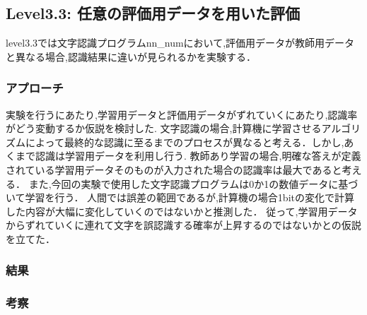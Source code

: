 \subsection{Level3.3: 任意の評価用データを用いた評価}

level3.3では文字認識プログラムnn\_numにおいて,評価用データが教師用データと異なる場合,認識結果に違いが見られるかを実験する．

\subsubsection{アプローチ}
実験を行うにあたり,学習用データと評価用データがずれていくにあたり,認識率がどう変動するか仮説を検討した.
文字認識の場合,計算機に学習させるアルゴリズムによって最終的な認識に至るまでのプロセスが異なると考える．しかし,あくまで認識は学習用データを利用し行う.
教師あり学習の場合,明確な答えが定義されている学習用データそのものが入力された場合の認識率は最大であると考える．
また,今回の実験で使用した文字認識プログラムは0か1の数値データに基づいて学習を行う．
人間では誤差の範囲であるが,計算機の場合1bitの変化で計算した内容が大幅に変化していくのではないかと推測した．
従って,学習用データからずれていくに連れて文字を誤認識する確率が上昇するのではないかとの仮説を立てた．

\subsubsection{結果}

\subsubsection{考察}

